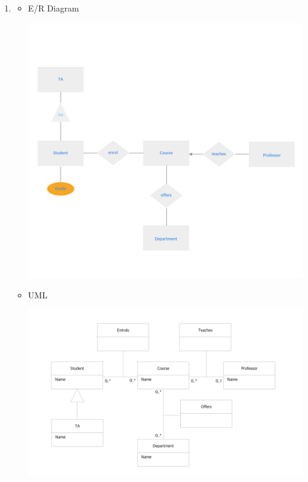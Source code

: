 \documentclass[12pt]{article}
\begin{document}
\begin{enumerate}[1.]
\begin{itemize}
    \end{itemize}

    \item

    \begin{itemize}
        \item E/R Diagram

        \begin{center}
        \includegraphics[width=\linewidth]{images/worksheet_15_solution_19.png}
        \end{center}

        \item UML

        \begin{center}
        \includegraphics[width=\linewidth]{images/worksheet_15_solution_20.png}
        \end{center}

    \end{itemize}


\end{enumerate}
\end{document}
